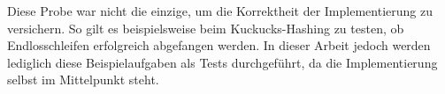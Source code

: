 Diese Probe war nicht die einzige, um die Korrektheit der Implementierung zu versichern. So gilt es beispielsweise beim Kuckucks-Hashing zu testen, ob Endlosschleifen erfolgreich abgefangen werden. In dieser Arbeit jedoch werden lediglich diese Beispielaufgaben als Tests durchgeführt, da die Implementierung selbst im Mittelpunkt steht.